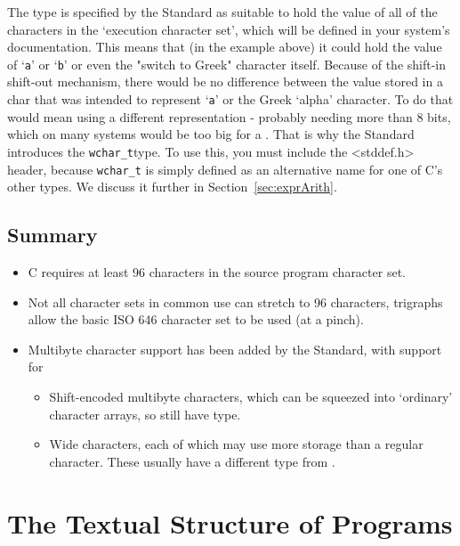    The \kchar{} type is specified by the Standard as suitable to
    hold the value of all of the characters in the `execution character
    set', which will be defined in your system's documentation. This means
    that (in the example above) it could hold the value of
    `\texttt{a}' or `\texttt{b}' or even the "switch to
    Greek" character itself. Because of the shift-in shift-out mechanism,
    there would be no difference between the value stored in a char that was
    intended to represent `\texttt{a}' or the Greek `alpha'
    character. To do that would mean using a different representation -
    probably needing more than 8 bits, which on many systems would be too big
    for a \kchar. That is why the Standard introduces the
    \texttt{wchar\_t}type. To use this, you must include the
    <stddef.h> header, because \texttt{wchar\_t} is simply defined as
    an alternative name for one of C's other types. We discuss it further in
    Section~\ref{sec:exprArith}.


  

  \subsection{Summary}

   \begin{itemize}
    \item C requires at least 96 characters in the source program character
     set.
    \item Not all character sets in common use can stretch to 96 characters,
     trigraphs allow the basic ISO 646 character set to be used (at a
     pinch).
    \item Multibyte character support has been added by the Standard, with
     support for
     \begin{itemize}
      \item Shift-encoded multibyte characters, which can be squeezed into
       `ordinary' character arrays, so still have \kchar
       type.
      \item Wide characters, each of which may use more storage than a regular
       character. These usually have a different type from
       \kchar.
     \end{itemize}
    
   \end{itemize}

  

 
        \section{The Textual Structure of Programs}
        

